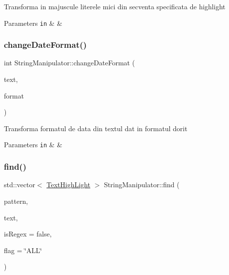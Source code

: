 Transforma in majuscule literele mici din secventa specificata de highlight


\begin{DoxyParams}[1]{Parameters}
\mbox{\tt in}  & {\em } & \\
\hline
\end{DoxyParams}
\mbox{\label{class_string_manipulator_ac35afff547abbd79b54b514e2d752a71}} 
\subsubsection{\texorpdfstring{change\+Date\+Format()}{changeDateFormat()}}
{\footnotesize\ttfamily int String\+Manipulator\+::change\+Date\+Format (\begin{DoxyParamCaption}\item[{Q\+String \&}]{text,  }\item[{date\+Format}]{format }\end{DoxyParamCaption})\hspace{0.3cm}{\ttfamily [static]}}

Transforma formatul de data din textul dat in formatul dorit


\begin{DoxyParams}[1]{Parameters}
\mbox{\tt in}  & {\em } & \\
\hline
\end{DoxyParams}
\mbox{\label{class_string_manipulator_adab4023d6e1e822008e3832c56e47d56}} 
\subsubsection{\texorpdfstring{find()}{find()}}
{\footnotesize\ttfamily std\+::vector$<$ \hyperlink{class_text_high_light}{Text\+High\+Light} $>$ String\+Manipulator\+::find (\begin{DoxyParamCaption}\item[{const Q\+String \&}]{pattern,  }\item[{const Q\+String \&}]{text,  }\item[{const bool}]{is\+Regex = {\ttfamily false},  }\item[{const Q\+String}]{flag = {\ttfamily \char`\"{}ALL\char`\"{}} }\end{DoxyParamCaption})\hspace{0.3cm}{\ttfamily [static]}}

